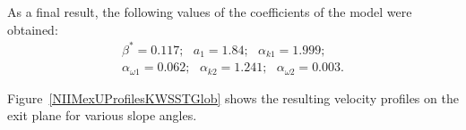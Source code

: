 \documentclass[applsci,article,submit,moreauthors,pdftex]{Definitions/mdpi}
\begin{document}
As a final result, the following values of the coefficients of the model were obtained:
\begin{equation}
	\begin{aligned}
		\beta^* = 0.117;\ \ \ a_1 = 1.84;\ \ \ \alpha_{k 1} = 1.999;\\
		\alpha_{\omega 1} = 0.062; \ \ \ \alpha_{k 2} = 1.241;\ \ \ \alpha_{\omega 2} = 0.003.
	\end{aligned}
\end{equation}

Figure~\ref{NIIMexUProfilesKWSSTGlob} shows the resulting velocity profiles on the exit plane for various slope angles.
\end{document}
